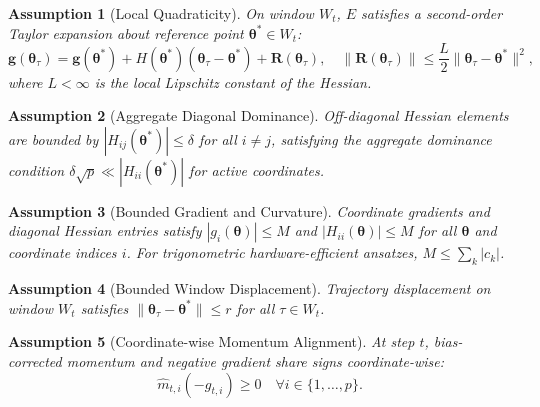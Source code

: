 \documentclass[11pt,a4paper]{article}
\newtheorem{assumption}{Assumption}
\begin{document}
\begin{assumption}[Local Quadraticity]
\label{ass:quadraticity}
On window $W_t$, $E$ satisfies a second-order Taylor expansion about reference point $\boldsymbol{\theta}^* \in W_t$:
\begin{equation}
\mathbf{g}(\boldsymbol{\theta}_\tau) = \mathbf{g}(\boldsymbol{\theta}^*) + H(\boldsymbol{\theta}^*)(\boldsymbol{\theta}_\tau - \boldsymbol{\theta}^*) + \mathbf{R}(\boldsymbol{\theta}_\tau), \quad \|\mathbf{R}(\boldsymbol{\theta}_\tau)\| \le \frac{L}{2} \|\boldsymbol{\theta}_\tau - \boldsymbol{\theta}^*\|^2,
\end{equation}
where $L < \infty$ is the local Lipschitz constant of the Hessian.
\end{assumption}

\begin{assumption}[Aggregate Diagonal Dominance]
\label{ass:diag_dominance}
Off-diagonal Hessian elements are bounded by $|H_{ij}(\boldsymbol{\theta}^*)| \le \delta$ for all $i \ne j$, satisfying the aggregate dominance condition $\delta \sqrt{p} \ll |H_{ii}(\boldsymbol{\theta}^*)|$ for active coordinates.
\end{assumption}

\begin{assumption}[Bounded Gradient and Curvature]
\label{ass:bounded_curvature}
Coordinate gradients and diagonal Hessian entries satisfy $|g_i(\boldsymbol{\theta})| \le M$ and $|H_{ii}(\boldsymbol{\theta})| \le M$ for all $\boldsymbol{\theta}$ and coordinate indices $i$. For trigonometric hardware-efficient ansatzes, $M \le \sum_k |c_k|$.
\end{assumption}

\begin{assumption}[Bounded Window Displacement]
\label{ass:displacement}
Trajectory displacement on window $W_t$ satisfies $\|\boldsymbol{\theta}_\tau - \boldsymbol{\theta}^*\| \le r$ for all $\tau \in W_t$.
\end{assumption}

\begin{assumption}[Coordinate-wise Momentum Alignment]
\label{ass:alignment}
At step $t$, bias-corrected momentum and negative gradient share signs coordinate-wise:
\begin{equation}
\hat{m}_{t,i} (-g_{t,i}) \ge 0 \quad \forall i \in \{1, \dots, p\}.
\end{equation}
\end{assumption}
\end{document}
